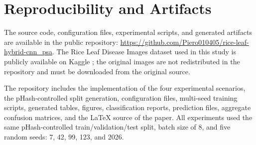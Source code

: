 \section{Reproducibility and Artifacts}

The source code, configuration files, experimental scripts, and generated artifacts are available in the public repository: \url{https://github.com/Piero010405/rice-leaf-hybrid-cnn_psa}. The Rice Leaf Disease Images dataset used in this study is publicly available on Kaggle \cite{kaggle_rice_leaf_disease}; the original images are not redistributed in the repository and must be downloaded from the original source.

The repository includes the implementation of the four experimental scenarios, the pHash-controlled split generation, configuration files, multi-seed training scripts, generated tables, figures, classification reports, prediction files, aggregate confusion matrices, and the LaTeX source of the paper. All experiments used the same pHash-controlled train/validation/test split, batch size of 8, and five random seeds: 7, 42, 99, 123, and 2026.